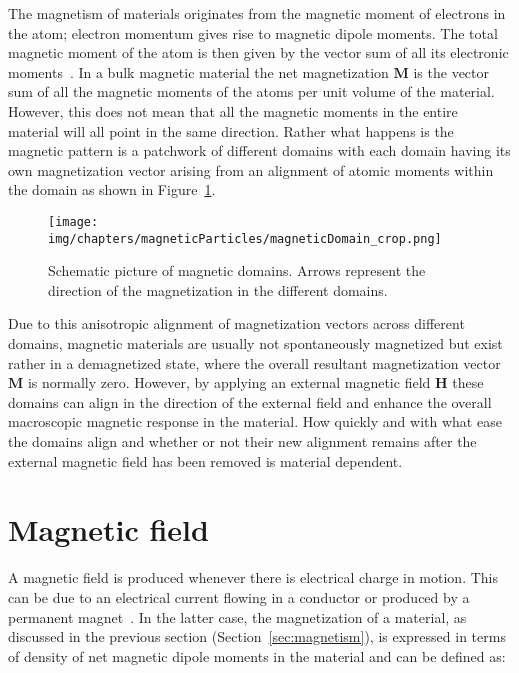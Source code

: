 The magnetism of materials originates from the magnetic moment of electrons in the atom; electron momentum gives rise to magnetic dipole moments. The total magnetic moment of the atom is then given by the vector sum of all its electronic moments~\cite{Cullity2011}. In a bulk magnetic material the net magnetization $\mathbf{M}$ is the vector sum of all the magnetic moments of the atoms per unit volume of the material. However, this does not mean that all the magnetic moments in the entire material will all point in the same direction. Rather what happens is the magnetic pattern is a patchwork of different domains with each domain having its own magnetization vector arising from an alignment of atomic moments within the domain as shown in Figure~\ref{fig:magneticDomain}\cite{Craik1995}. 

\begin{figure}[htb]
\centering
\texttt{[image: img/chapters/magneticParticles/magneticDomain\_crop.png]}
\caption[Magnetic domains in magnetic materials]{Schematic picture of magnetic domains. Arrows represent the direction of the magnetization in the different domains.}%
\label{fig:magneticDomain}%
\end{figure}

Due to this anisotropic alignment of magnetization vectors across different domains, magnetic materials are usually not spontaneously magnetized but exist rather in a demagnetized state, where the overall resultant magnetization vector $\mathbf{M}$ is normally zero. However, by applying an external magnetic field $\mathbf{H}$ these domains can align in the direction of the external field and enhance the overall macroscopic magnetic response in the material. How quickly and with what ease the domains align and whether or not their new alignment remains after the external magnetic field has been removed is material dependent. 

\section{Magnetic field}\label{subsec:magneticField}
A magnetic field is produced whenever there is electrical charge in motion. This can be due to an electrical current flowing in a conductor or produced by a permanent magnet~\cite{Oersted1820,Skomski2008}. In the latter case, the magnetization of a material, as discussed in the previous section (Section~\ref{sec:magnetism}), is expressed in terms of density of net magnetic dipole moments in the material and can be defined as:

